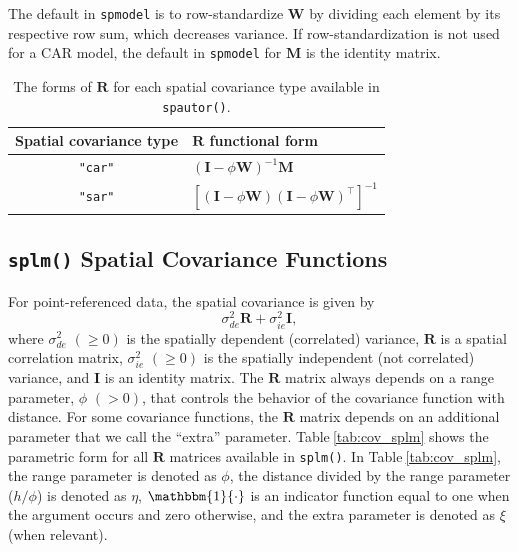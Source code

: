\documentclass[10pt,letterpaper]{article}
\begin{document}
The default in \texttt{spmodel} is to row-standardize \(\mathbf{W}\) by
dividing each element by its respective row sum, which decreases
variance. If row-standardization is not used for a CAR model, the
default in \texttt{spmodel} for \(\mathbf{M}\) is the identity matrix.

\begin{table}
  \centering
  \begin{tabular}{c|l}
  \hline
  Spatial covariance type & $\mathbf{R}$ functional form \\
  \hline
  \texttt{"car"} & $(\mathbf{I} - \phi\mathbf{W})^{-1}\mathbf{M}$ \\
  \texttt{"sar"} & $[(\mathbf{I} - \phi\mathbf{W})(\mathbf{I} - \phi\mathbf{W})^\top]^{-1}$ \\
  \hline
  \end{tabular}
  \caption{The forms of $\mathbf{R}$ for each spatial covariance type available in \texttt{spautor()}.}
  \label{tab:cov_spautor}
\end{table}

\hypertarget{splm-spatial-covariance-functions}{%
\subsection{\texorpdfstring{\texttt{splm()} Spatial Covariance
Functions}{splm() Spatial Covariance Functions}}\label{splm-spatial-covariance-functions}}

For point-referenced data, the spatial covariance is given by
\begin{equation*}
\sigma^2_{de}\mathbf{R} + \sigma^2_{ie} \mathbf{I},
\end{equation*} where \(\sigma^2_{de}\) \((\geq 0)\) is the spatially
dependent (correlated) variance, \(\mathbf{R}\) is a spatial correlation
matrix, \(\sigma^2_{ie}\) \((\geq 0)\) is the spatially independent (not
correlated) variance, and \(\mathbf{I}\) is an identity matrix. The
\(\mathbf{R}\) matrix always depends on a range parameter, \(\phi\)
\((> 0)\), that controls the behavior of the covariance function with
distance. For some covariance functions, the \(\mathbf{R}\) matrix
depends on an additional parameter that we call the ``extra'' parameter.
Table\(~\)\ref{tab:cov_splm} shows the parametric form for all
\(\mathbf{R}\) matrices available in \texttt{splm()}. In
Table\(~\)\ref{tab:cov_splm}, the range parameter is denoted as
\(\phi\), the distance divided by the range parameter (\(h / \phi\)) is
denoted as \(\eta\), \(\mathbbm{1}\{\cdot\}\) is an indicator function
equal to one when the argument occurs and zero otherwise, and the extra
parameter is denoted as \(\xi\) (when relevant).
\end{document}
